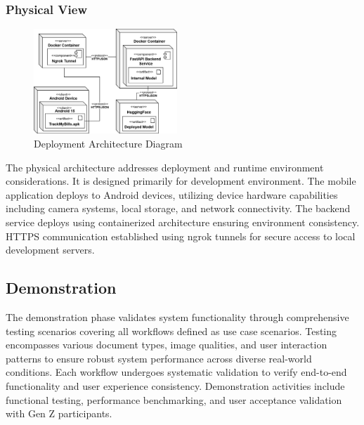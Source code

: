\subsubsection{Physical View}
\begin{figure}[htbp]
    \centering
    \includegraphics[width=0.48\textwidth]{images/deployment-diagram.png}
    \caption{Deployment Architecture Diagram}
    \label{fig:deployment}
\end{figure}
The physical architecture addresses deployment and runtime environment considerations. It is designed primarily for development environment. The mobile application deploys to Android devices, utilizing device hardware capabilities including camera systems, local storage, and network connectivity. The backend service deploys using containerized architecture ensuring environment consistency. HTTPS communication established using ngrok tunnels for secure access to local development servers. 


\subsection{Demonstration}
The demonstration phase validates system functionality through comprehensive testing scenarios covering all workflows defined as use case scenarios. Testing encompasses various document types, image qualities, and user interaction patterns to ensure robust system performance across diverse real-world conditions. Each workflow undergoes systematic validation to verify end-to-end functionality and user experience consistency. Demonstration activities include functional testing, performance benchmarking, and user acceptance validation with Gen Z participants.

